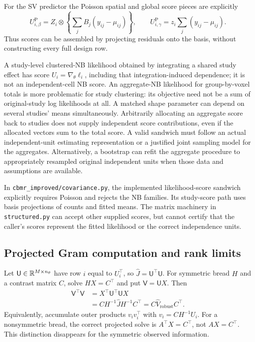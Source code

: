 For the SV predictor the Poisson spatial and global score pieces are
explicitly
\[
 U_{i,\beta}^{\mathrm P}
    =Z_i\otimes\left\{\sum_jB_j(y_{ij}-\mu_{ij})\right\},
 \qquad
 U_{i,\gamma}^{\mathrm P}
    =z_i\sum_j(y_{ij}-\mu_{ij}).
\]
Thus scores can be assembled by projecting residuals onto the basis,
without constructing every full design row.

A study-level clustered-NB likelihood obtained by integrating a shared
study effect has score $U_i=\nabla_\theta\ell_i$, including that
integration-induced dependence; it is not an independent-cell NB score.
An aggregate-NB likelihood for group-by-voxel totals is more problematic
for study clustering: its objective need not be a sum of original-study
log likelihoods at all.  A matched shape parameter can depend on several
studies' means simultaneously.  Arbitrarily allocating an aggregate
score back to studies does not supply independent score contributions,
even if the allocated vectors sum to the total score.  A valid sandwich
must follow an actual independent-unit estimating representation or a
justified joint sampling model for the aggregates.  Alternatively, a
bootstrap can refit the aggregate procedure to appropriately resampled
original independent units when those data and assumptions are available.

In \texttt{cbmr\_improved/covariance.py}, the implemented likelihood-score
sandwich explicitly requires Poisson and rejects the NB families.
Its study-score path uses basis projections of counts and fitted means.
The matrix machinery in \texttt{structured.py} can accept other supplied
scores, but cannot certify that the caller's scores represent the fitted
likelihood or the correct independence units.

\subsection{Projected Gram computation and rank limits}
\label{cov-sandwich-gram}

Let $\mathsf U\in\mathbb R^{M\times n_\theta}$ have row $i$ equal to
$U_i^\top$, so $\widehat J=\mathsf U^\top\mathsf U$.
For symmetric bread $H$ and a contrast matrix $C$, solve
$HX=C^\top$ and put $\mathsf V=\mathsf U X$.  Then
\begin{align}
 \mathsf V^\top\mathsf V
 &=X^\top\mathsf U^\top\mathsf U X\\
 &=CH^{-1}\widehat JH^{-1}C^\top
 =C\widehat V_{\mathrm{robust}}C^\top .
 \label{cov-projected-gram}
\end{align}
Equivalently, accumulate outer products
$v_iv_i^\top$ with $v_i=CH^{-1}U_i$.
For a nonsymmetric bread, the correct projected solve is
$A^\top X=C^\top$, not $AX=C^\top$.
This distinction disappears for the symmetric observed information.

